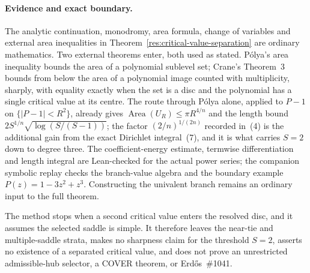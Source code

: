 \documentclass[11pt]{article}
\begin{document}
\paragraph{Evidence and exact boundary.}
\label{bdry:critical-value-separation}
The analytic continuation, monodromy, area formula, change of variables and
external area inequalities in Theorem~\ref{res:critical-value-separation} are
ordinary mathematics.  Two external theorems enter, both used as stated.
P\'olya's area inequality \cite[printed pp.~280--282]{polya1928} bounds the
area of a polynomial sublevel set; Crane's Theorem~3 \cite{crane} bounds from
below the area of a polynomial image counted with multiplicity, sharply, with
equality exactly when the set is a disc and the polynomial has a single
critical value at its centre.  The route through P\'olya alone, applied to
$P-1$ on $\{|P-1|<R^2\}$, already gives
$\operatorname{Area}(U_R)\le\pi R^{4/n}$ and the length bound
$2S^{1/n}\sqrt{\log(S/(S-1))}$; the factor $(2/n)^{1/(2n)}$ recorded in~(4) is
the additional gain from the exact Dirichlet integral~(7), and it is what
carries $S=2$ down to degree three.  The coefficient-energy estimate, termwise
differentiation and length integral are Lean-checked for the actual power
series; the companion symbolic replay checks the branch-value algebra and the
boundary example $P(z)=1-3z^2+z^3$.  Constructing the univalent branch remains
an ordinary input to the full theorem.

The method stops when a
second critical value enters the resolved disc, and it assumes the selected
saddle is simple.  It therefore leaves the near-tie and multiple-saddle
strata, makes no sharpness claim for the threshold $S=2$, asserts no existence
of a separated critical value, and does not prove an unrestricted
admissible-hub selector, a COVER theorem, or Erd\H{o}s~\#1041.
\end{document}
